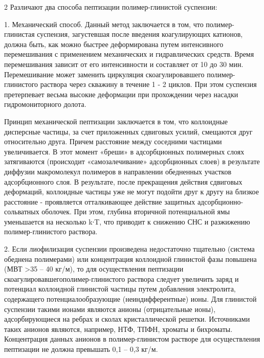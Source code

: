 \begin{multicols}{2}
Различают два способа пептизации полимер-глинистой суспензии:

1. Механический способ. Данный метод заключается в том, что
полимер-глинистая суспензия, загустевшая после введения коагулирующих
катионов, должна быть, как можно быстрее деформирована путем
интенсивного перемешивания с применением механических и гидравлических
средств. Время перемешивания зависит от его интенсивности и составляет
от 10 до 30 мин. Перемешивание может заменить циркуляция
скоагулировавшего полимер-глинистого раствора через скважину в течение 1
- 2 циклов. При этом суспензия претерпевает весьма высокие деформации
при прохождении через насадки гидромониторного долота.

Принцип механической пептизации заключается в том, что коллоидные
дисперсные частицы, за счет приложенных сдвиговых усилий, смещаются друг
относительно друга. Причем расстояние между соседними частицами
увеличивается. В этот момент «бреши» в адсорбционных полимерных слоях
затягиваются (происходит «самозалечивание» адсорбционных слоев) в
результате диффузии макромолекул полимеров в направлении обедненных
участков адсорбционного слоя. В результате, после прекращения действия
сдвиговых деформаций, коллоидные частицы уже не могут подойти друг к
другу на близкое расстояние - проявляется отталкивающее действие
защитных адсорбционно-сольватных оболочек. При этом, глубина вторичной
потенциальной ямы уменьшается на несколько k∙T, что приводит к снижению
СНС и разжижению полимер-глинистого раствора.

2. Если лиофилизация суспензии произведена недостаточно тщательно
(система обеднена полимерами) или концентрация коллоидной глинистой фазы
повышена (МВТ \textgreater35 -- 40 кг/м), то для
осуществления пептизации скоагулировавшегополимер-глинистого раствора
следует увеличить заряд и потенциал коллоидной глинистой частицы путем
добавления электролита, содержащего потенциалообразующие
(неиндифферентные) ионы. Для глинистой суспензии такими ионами являются
анионы (отрицательные ионы), адсорбирующиеся на ребрах и сколах
кристаллической решетки. Источниками таких анионов являются, например,
НТФ, ТПФН, хроматы и бихроматы. Концентрация данных анионов в
полимер-глинистом растворе для осуществления пептизации не должна
превышать 0,1 -- 0,3 кг/м.


\end{multicols}
